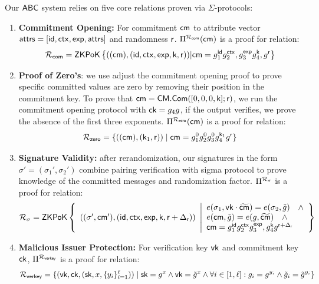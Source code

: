 Our $\mathsf{ABC}$ system relies on five core relations proven via $\Sigma$-protocols:
\begin{enumerate}
    \item \textbf{Commitment Opening:} For commitment $\mathsf{cm}$ to attribute vector $\mathsf{attrs}  = [\mathsf{id}, \mathsf{ctx}, \mathsf{exp}, \mathsf{attrs}]$ and randomness $\mathsf{r}$. $\Pi^{\mathcal{R}_{\mathsf{com}}}(\mathsf{cm})$ is a proof for relation:
    \[
     {\mathcal{R}_{\mathsf{com}}} = {\mathsf{ZKPoK}} \left\{((\mathsf{cm}), (\mathsf{id}, \mathsf{ctx}, \mathsf{exp}, \mathsf{k}, \mathsf{r}))| \mathsf{cm} = g_1^{\mathsf{id}}g_2^{\mathsf{ctx}},g_3^{\mathsf{exp}}g_4^{\mathsf{k}}, g^{\mathsf{r}} \right\}
    \]

     \item \textbf{Proof of Zero's}: we use adjust the commitment opening proof to prove specific committed values are zero by removing their position in the commitment key. To prove that $\mathsf{cm}=\mathsf{CM.Com}([0,0,0,\mathsf{k}];\mathsf{r})$, we run the commitment opening protocol with $\mathsf{ck} = g_4g$, if the output verifies, we prove the absence of the first three exponents.
     $\Pi^{\mathcal{R}_{\mathsf{zero}}}(\mathsf{cm})$ is a proof for relation: 
    \[
    {\mathcal{R}_{\mathsf{zero}}} = \{((\mathsf{cm}),(\mathsf{k}_1, \mathsf{r})) \mid \mathsf{cm} = g_1^0g_2^0g_3^0g_4^{\mathsf{k}_1}g^{\mathsf{r}} \}
    \]
     
    
    \item \textbf{Signature Validity:} after rerandomization, our signatures in the form $\sigma' = (\sigma_1', \sigma_2')$ combine pairing verification with sigma protocol to prove knowledge of the committed messages and randomization factor. $\Pi^{\mathcal{R}_{\sigma}}$ is a proof for relation:
         \[
    {\mathcal{R}_{\sigma}} = {\mathsf{ZKPoK}} \left\{ 
    \begin{array}{l} 
    ((\sigma', \mathsf{cm}'), (\mathsf{id}, \mathsf{ctx}, \mathsf{exp}, \mathsf{k}, \mathsf{r} + \Delta_{\mathsf{r}})) \\
    \end{array} 
    \middle|
    \begin{array}{l}
    e(\sigma_1, \mathsf{vk} \cdot \widetilde{\mathsf{cm}}) = e(\sigma_2, \tilde{g}) \quad \wedge \\
    e(\mathsf{cm}, \tilde{g}) = e(g, \widetilde{\mathsf{cm}}) \quad \wedge\\
    \mathsf{cm} = g_1^{\mathsf{id}}g_2^{\mathsf{ctx}}g_3^{\mathsf{exp}},g_4^{\mathsf{k}} g^{\mathsf{r} + \Delta_{\mathsf{r}}} \\
    \end{array} 
    \right\}
    \]


    \item \textbf{Malicious Issuer Protection:} For verification key $\mathsf{vk}$ and commitment key $\mathsf{ck}$, $\Pi^{\mathcal{R}_{\mathsf{verkey}}}$ is a proof for relation:
    \[
    \mathcal{R}_{\mathsf{verkey}} = \{(\mathsf{vk}, \mathsf{ck}, (\mathsf{sk}, x, \{y_i\}_{i=1}^{\ell})) \mid \mathsf{sk} = g^x \wedge \mathsf{vk} = \tilde{g}^x \wedge 
    \forall i \in [1,\ell]: g_i = g^{y_i} \wedge \tilde{g}_i = \tilde{g}^{y_i} \}
    \]
    

\end{enumerate}

